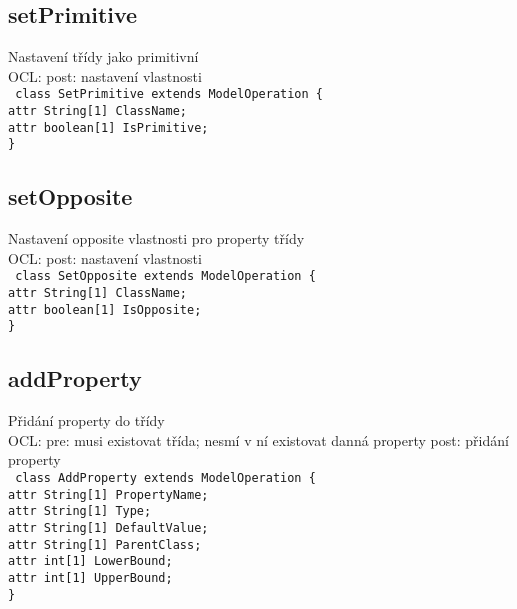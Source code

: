 \documentclass[11pt,a4paper]{article}
\begin{document}
	\subsection{setPrimitive}
	Nastavení třídy jako primitivní \\
	OCL: post: nastavení vlastnosti \\
	\texttt{
    class SetPrimitive extends ModelOperation \{\\
      attr String[1] ClassName;\\
      attr boolean[1] IsPrimitive;\\
    \}
	}
	\subsection{setOpposite}
	Nastavení opposite vlastnosti pro property třídy \\
	OCL: post: nastavení vlastnosti \\
	\texttt{
    class SetOpposite extends ModelOperation \{\\
      attr String[1] ClassName;\\
      attr boolean[1] IsOpposite;\\
    \}
	}
	\subsection{addProperty}
	Přidání property do třídy \\
	OCL: pre: musi existovat třída; nesmí v ní existovat danná property post: přidání property \\
	\texttt{
    class AddProperty extends ModelOperation \{\\
      attr String[1] PropertyName;\\
      attr String[1] Type;\\
      attr String[1] DefaultValue;\\
      attr String[1] ParentClass;\\
      attr int[1] LowerBound;\\
      attr int[1] UpperBound;\\
    \}
	}			
\end{document}
